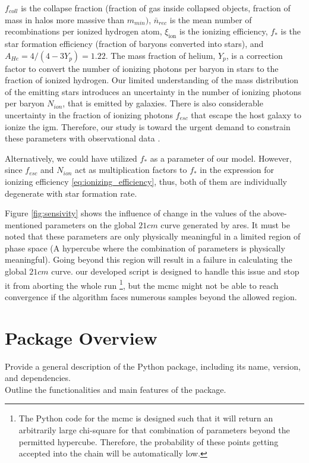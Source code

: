 \documentclass[%
 reprint,
 amsmath,amssymb,
 aps,
]{revtex4-2}
\begin{document}
\begin{enumerate}
    $f_{coll}$ is the collapse fraction (fraction of gas inside collapsed objects, fraction of mass in halos more massive than $m_{min})$, $\bar{n}_{rec}$ is the mean number of recombinations per ionized hydrogen atom, $\xi_{\text{ion}}$ is the ionizing efficiency, $f_*$ is the star formation efficiency (fraction of baryons converted into stars), and $A_{He} = 4/(4 - 3Y_p) = 1.22$. The mass fraction of helium, $Y_p$, is a correction factor to convert the number of ionizing photons per baryon in stars to the fraction of ionized hydrogen. Our limited understanding of the mass distribution of the emitting stars introduces an uncertainty in the number of ionizing photons per baryon $N_{ion}$, that is emitted by galaxies. There is also considerable uncertainty in the fraction of ionizing photons $f_{esc}$ that escape the host galaxy to ionize the \gls{igm}. Therefore, our study is toward the urgent demand to constrain these parameters with observational data \cite{low_frequency, 21century}.\par
    Alternatively, we could have utilized $f_*$ as a parameter of our model. However, since $f_{esc}$ and $N_{ion}$ act as multiplication factors to $f_*$ in the expression for ionizing efficiency \ref{eq:ionizing_efficiency}, thus, both of them are individually degenerate with star formation rate.
\end{enumerate}
Figure \ref{fig:sensivity} shows the influence of change in the values of the above-mentioned parameters on the global $21cm$ curve generated by \gls{ares}. It must be noted that these parameters are only physically meaningful in a limited region of phase space (A hypercube where the combination of parameters is physically meaningful). Going beyond this region will result in a failure in calculating the global $21cm$ curve. our developed script is designed to handle this issue and stop it from aborting the whole run \footnote{The Python code for the \gls{mcmc} is designed such that it will return an arbitrarily large chi-square for that combination of parameters beyond the permitted hypercube. Therefore, the probability of these points getting accepted into the chain will be automatically low.}, but the \gls{mcmc} might not be able to reach convergence if the algorithm faces numerous samples beyond the allowed region.\par
\section{Package Overview}
\label{sec:package}
Provide a general description of the Python package, including its name, version, and dependencies.\\
Outline the functionalities and main features of the package.\\
\end{document}
